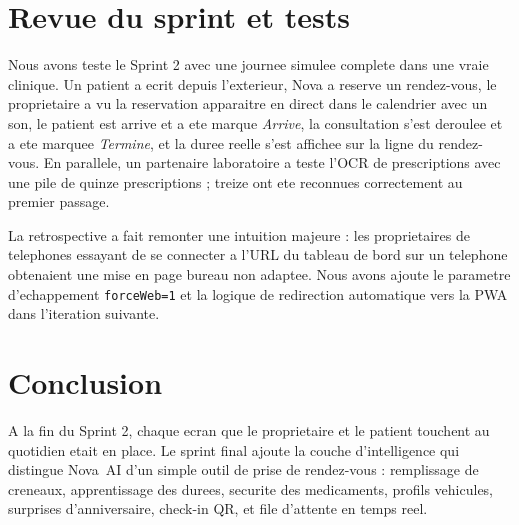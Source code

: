 \section{Revue du sprint et tests}
Nous avons teste le Sprint 2 avec une journee simulee complete dans
une vraie clinique. Un patient a ecrit depuis l'exterieur, Nova a
reserve un rendez-vous, le proprietaire a vu la reservation apparaitre
en direct dans le calendrier avec un son, le patient est arrive et a
ete marque \emph{Arrive}, la consultation s'est deroulee et a ete
marquee \emph{Termine}, et la duree reelle s'est affichee sur la ligne
du rendez-vous. En parallele, un partenaire laboratoire a teste l'OCR
de prescriptions avec une pile de quinze prescriptions ; treize ont ete
reconnues correctement au premier passage.

La retrospective a fait remonter une intuition majeure : les
proprietaires de telephones essayant de se connecter a l'URL du
tableau de bord sur un telephone obtenaient une mise en page bureau
non adaptee. Nous avons ajoute le parametre d'echappement
\texttt{forceWeb=1} et la logique de redirection automatique vers la
PWA dans l'iteration suivante.

\section{Conclusion}
A la fin du Sprint 2, chaque ecran que le proprietaire et le patient
touchent au quotidien etait en place. Le sprint final ajoute la couche
d'intelligence qui distingue Nova~AI d'un simple outil de prise de
rendez-vous : remplissage de creneaux, apprentissage des durees,
securite des medicaments, profils vehicules, surprises d'anniversaire,
check-in QR, et file d'attente en temps reel.
